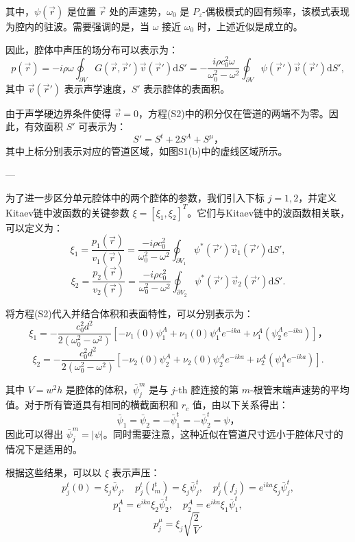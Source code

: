 其中，\( \psi(\vec{r}) \) 是位置 \( \vec{r} \) 处的声速势，\( \omega_0 \) 是 \( P_z \)-偶极模式的固有频率，该模式表现为腔内的驻波。需要强调的是，当 \( \omega \) 接近 \( \omega_0 \) 时，上述近似是成立的。

因此，腔体中声压的场分布可以表示为：
\[
p(\vec{r}) = -i \rho \omega \oint_{\partial V} G(\vec{r}, \vec{r}') \vec{v}(\vec{r}') \mathrm{d}S'
= -\frac{i \rho c_0^2 \omega}{\omega_0^2 - \omega^2} \oint_{\partial V} \psi(\vec{r}') \vec{v}(\vec{r}') \mathrm{d}S', 
\]
其中 \( \vec{v}(\vec{r}') \) 表示声学速度，\( S' \) 表示腔体的表面积。

由于声学硬边界条件使得 \( \vec{v} = 0 \)，方程(S2)中的积分仅在管道的两端不为零。因此，有效面积 \( S' \) 可表示为：
\[
S' = S^t + 2S^A + S^\mu，
\]
其中上标分别表示对应的管道区域，如图S1(b)中的虚线区域所示。

---

为了进一步区分单元腔体中的两个腔体的参数，我们引入下标 \( j = 1, 2 \)，并定义Kitaev链中波函数的关键参数 \( \xi = [\xi_1, \xi_2]^T \)。它们与Kitaev链中的波函数相关联，可以定义为：
\[
\xi_1 = \frac{p_1(\vec{r})}{v_1(\vec{r})} = \frac{-i \rho c_0^2}{\omega_0^2 - \omega^2} \oint_{\partial V_1} \psi^*(\vec{r}') \vec{v}_1(\vec{r}') \mathrm{d}S',
\]
\[
\xi_2 = \frac{p_2(\vec{r})}{v_2(\vec{r})} = \frac{-i \rho c_0^2}{\omega_0^2 - \omega^2} \oint_{\partial V_2} \psi^*(\vec{r}') \vec{v}_2(\vec{r}') \mathrm{d}S'. 
\]

将方程(S2)代入并结合体积和表面特性，可以分别表示为：
\[
\xi_1 = -\frac{c_0^2 d^2}{2(\omega_0^2 - \omega^2)} \left[ -\nu_1(0) \psi_1^A + \nu_1(0) \psi_1^A e^{-ika} + \nu_1^A(\psi_2^A e^{-ika}) \right]，
\]
\[
\xi_2 = -\frac{c_0^2 d^2}{2(\omega_0^2 - \omega^2)} \left[ -\nu_2(0) \psi_2^A + \nu_2(0) \psi_2^A e^{-ika} + \nu_2^A(\psi_1^A e^{-ika}) \right]. 
\]

其中 \( V = w^2 h \) 是腔体的体积，\( \bar{\psi}_j^m \) 是与 \( j \)-th 腔连接的第 \( m \)-根管末端声速势的平均值。对于所有管道具有相同的横截面积和 \( r_c \) 值，由以下关系得出：
\[
\bar{\psi}_1 = \bar{\psi}_2 = -\bar{\psi}_1^t = -\bar{\psi}_2^t = \psi，
\]
因此可以得出 \( \bar{\psi}_j^m = |\psi| \)。同时需要注意，这种近似在管道尺寸远小于腔体尺寸的情况下是适用的。

根据这些结果，可以以 \( \xi \) 表示声压：
\[
p_j^t(0) = \xi_j \bar{\psi}_j, \quad
p_j^t(l_m^t) = \xi_j \bar{\psi}_j^t, \quad
p_j^t(f_j) = e^{ika} \xi_j \bar{\psi}_j^t,
\]
\[
p_1^A = e^{ika} \xi_2 \bar{\psi}_2^t, \quad
p_2^A = e^{ika} \xi_1 \bar{\psi}_1^t,
\]
\[
p_j^\mu = \xi_j \sqrt{\frac{2}{V}}. 
\]

